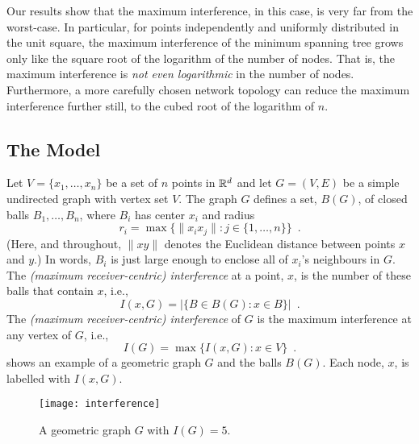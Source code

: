 \documentclass{patmorin}
\begin{document}
Our results show that the maximum interference, in this case, is very
far from the worst-case.  In particular, for points independently and
uniformly distributed in the unit square, the maximum interference of the
minimum spanning tree grows only like the square root of the logarithm
of the number of nodes.  That is, the maximum interference is \emph{not
even logarithmic} in the number of nodes.  Furthermore, a more carefully
chosen network topology can reduce the maximum interference further still,
to the cubed root of the logarithm of $n$.

\subsection{The Model}

Let $V=\{x_1,\ldots,x_n\}$ be a set of $n$ points in $\mathbb{R}^d$ and let
$G=(V,E)$ be a simple undirected graph with vertex set $V$.  The graph
$G$ defines a set, $B(G)$, of closed balls $B_1,\ldots,B_n$, where $B_i$
has center $x_i$ and radius
\[
   r_i = \max\{\|x_ix_j\| : j\in\{1,\ldots,n\}\} \enspace .
\]
(Here, and throughout, $\|xy\|$ denotes the Euclidean distance between
points $x$ and $y$.)  In words, $B_i$ is just large enough to enclose
all of $x_i$'s neighbours in $G$.  The \emph{(maximum receiver-centric)
interference} at a point, $x$, is the number of these balls that contain
$x$, i.e.,
\[
    I(x,G) = |\{B\in B(G) : x\in B\}| \enspace .
\]
The \emph{(maximum receiver-centric) interference} of $G$ is the maximum
interference at any vertex of $G$, i.e.,
\[
   I(G) = \max\{I(x,G) : x\in V\} \enspace .
\]
 shows an example of a geometric graph $G$ and the
balls $B(G)$.  Each node, $x$, is labelled with $I(x,G)$.

\begin{figure}
  \begin{center}
    \texttt{[image: interference]}
  \end{center}
  \caption{A geometric graph $G$ with $I(G)=5$.}
\end{figure}
\end{document}
